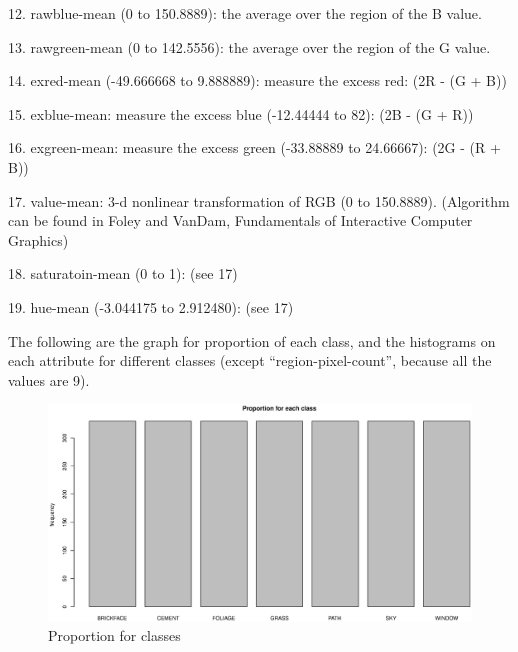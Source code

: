 \documentclass{article}
\begin{document}
    12. rawblue-mean (0 to 150.8889): the average over the region of the B value.
    
    13. rawgreen-mean (0 to 142.5556): the average over the region of the G value.
    
    14. exred-mean (-49.666668 to 9.888889): measure the excess red:  (2R - (G + B))
    
    15. exblue-mean: measure the excess blue (-12.44444 to 82):  (2B - (G + R))
    
    16. exgreen-mean: measure the excess green (-33.88889 to 24.66667):  (2G - (R + B))
    
    17. value-mean:  3-d nonlinear transformation of RGB (0 to 150.8889). (Algorithm can be found in Foley and VanDam, Fundamentals of Interactive Computer 
        Graphics)
        
    18. saturatoin-mean (0 to 1):  (see 17)
    
    19. hue-mean (-3.044175 to 2.912480):  (see 17)
    
The following are the graph for proportion of each class, and the histograms on each attribute for different classes (except ``region-pixel-count'', 
because all the values are 9).

\begin{figure}[htp]
\centering
\includegraphics[width=12cm]{class.eps}
\caption{Proportion for classes}
\end{figure}
\end{document}
